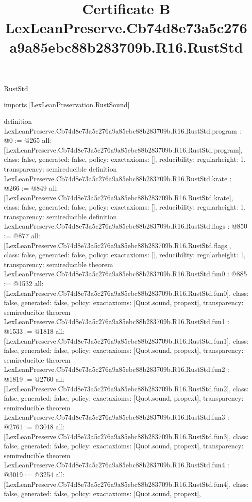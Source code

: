 \begin{lexlean}{RustStd}
\title{Certificate B LexLeanPreserve.Cb74d8e73a5c276a9a85ebc88b283709b.R16.RustStd}
\begin{coremodule}
imports [LexLeanPreservation.RustSound]

definition LexLeanPreserve.Cb74d8e73a5c276a9a85ebc88b283709b.R16.RustStd.program : @0 := @265 {
  all: [LexLeanPreserve.Cb74d8e73a5c276a9a85ebc88b283709b.R16.RustStd.program],
  class: false,
  generated: false,
  policy: exact{axioms: []},
  reducibility: regular{height: 1},
  transparency: semireducible
}
definition LexLeanPreserve.Cb74d8e73a5c276a9a85ebc88b283709b.R16.RustStd.krate : @266 := @849 {
  all: [LexLeanPreserve.Cb74d8e73a5c276a9a85ebc88b283709b.R16.RustStd.krate],
  class: false,
  generated: false,
  policy: exact{axioms: []},
  reducibility: regular{height: 1},
  transparency: semireducible
}
definition LexLeanPreserve.Cb74d8e73a5c276a9a85ebc88b283709b.R16.RustStd.flags : @850 := @877 {
  all: [LexLeanPreserve.Cb74d8e73a5c276a9a85ebc88b283709b.R16.RustStd.flags],
  class: false,
  generated: false,
  policy: exact{axioms: []},
  reducibility: regular{height: 1},
  transparency: semireducible
}
theorem LexLeanPreserve.Cb74d8e73a5c276a9a85ebc88b283709b.R16.RustStd.fun0 : @885 := @1532 {
  all: [LexLeanPreserve.Cb74d8e73a5c276a9a85ebc88b283709b.R16.RustStd.fun0],
  class: false,
  generated: false,
  policy: exact{axioms: [Quot.sound, propext]},
  transparency: semireducible
}
theorem LexLeanPreserve.Cb74d8e73a5c276a9a85ebc88b283709b.R16.RustStd.fun1 : @1533 := @1818 {
  all: [LexLeanPreserve.Cb74d8e73a5c276a9a85ebc88b283709b.R16.RustStd.fun1],
  class: false,
  generated: false,
  policy: exact{axioms: [Quot.sound, propext]},
  transparency: semireducible
}
theorem LexLeanPreserve.Cb74d8e73a5c276a9a85ebc88b283709b.R16.RustStd.fun2 : @1819 := @2760 {
  all: [LexLeanPreserve.Cb74d8e73a5c276a9a85ebc88b283709b.R16.RustStd.fun2],
  class: false,
  generated: false,
  policy: exact{axioms: [Quot.sound, propext]},
  transparency: semireducible
}
theorem LexLeanPreserve.Cb74d8e73a5c276a9a85ebc88b283709b.R16.RustStd.fun3 : @2761 := @3018 {
  all: [LexLeanPreserve.Cb74d8e73a5c276a9a85ebc88b283709b.R16.RustStd.fun3],
  class: false,
  generated: false,
  policy: exact{axioms: [Quot.sound, propext]},
  transparency: semireducible
}
theorem LexLeanPreserve.Cb74d8e73a5c276a9a85ebc88b283709b.R16.RustStd.fun4 : @3019 := @3254 {
  all: [LexLeanPreserve.Cb74d8e73a5c276a9a85ebc88b283709b.R16.RustStd.fun4],
  class: false,
  generated: false,
  policy: exact{axioms: [Quot.sound, propext]},
}
\end{coremodule}
\end{lexlean}
